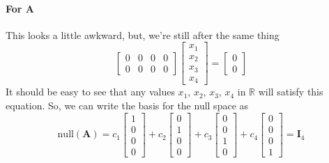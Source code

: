 \documentclass{article}
\begin{document}
            \paragraph{For $\mathbf{A}$}
                This looks a little awkward, but, we're still after the same thing
                \[
                    \begin{bmatrix}0&0&0&0\\0&0&0&0\end{bmatrix}
                    \begin{bmatrix}x_1\\x_2\\x_3\\x_4\end{bmatrix}
                    =
                    \begin{bmatrix}0\\0\end{bmatrix}
                \]
                It should be easy to see that any values $x_1$, $x_2$, $x_3$, $x_4$ in $\mathbb{R}$
                will satisfy this equation. So, we can write the basis for the null space as
                \[
                    \text{null}(\mathbf{A})=c_1\begin{bmatrix}1\\0\\0\\0\end{bmatrix}+c_2\begin{bmatrix}0\\1\\0\\0\end{bmatrix}+c_3\begin{bmatrix}0\\0\\1\\0\end{bmatrix}+c_4\begin{bmatrix}0\\0\\0\\1\end{bmatrix}
                    =
                    \mathbf{I}_4
                \]
\end{document}
